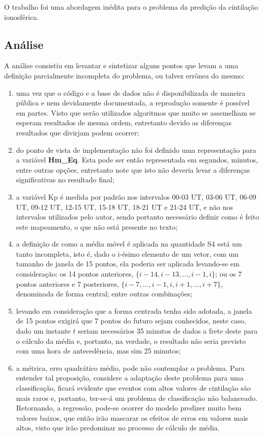 O trabalho foi uma abordagem inédita para o problema da predição da cintilação ionosférica.

\subsection{Análise}

A análise consistiu em levantar e sintetizar alguns pontos que levam a uma definição parcialmente incompleta do problema, ou talvez errônea do mesmo:

\begin{enumerate}
\item uma vez que o código e a base de dados não é disponibilizada de maneira pública e nem devidamente documentada, a reprodução somente é possível em partes. Visto que serão utilizados algoritmos que muito se assemelham se esperam resultados de mesma ordem, entretanto devido as diferenças resultados que divirjam podem ocorrer;
\item do ponto de vista de implementação não foi definido uma representação para a variável {\bf Hm\_Eq}. Esta pode ser então representada em segundos, minutos, entre outras opções, entretanto note que isto não deveria levar a diferenças significativas no resultado final;
\item a variável Kp é medida por padrão nos intervalos 00-03 UT, 03-06 UT, 06-09 UT, 09-12 UT, 12-15 UT, 15-18 UT, 18-21 UT e 21-24 UT, e não nos intervalos utilizados pelo autor, sendo portanto necessário definir como é feito este mapeamento, o que não está presente no texto;
\item a definição de como a média móvel é aplicada na quantidade S4 está um tanto incompleta, isto é, dado o i-ésimo elemento de um vetor, com um tamanho de janela de 15 pontos, ela poderia ser aplicada levando-se em consideração: os 14 pontos anteriores, $\{i-14, i-13, ..., i-1, i\}$; ou os 7 pontos anteriores e 7 posteriores, $\{i-7,...,i-1,i,i+1,...,i+7\}$, denominada de forma central; entre outras combinações;
\item levando em consideração que a forma centrada tenha sido adotada, a janela de 15 pontos exigirá que 7 pontos do futuro sejam conhecidos, neste caso, dado um instante $t$ seriam necessários 35 minutos de dados a frete deste para o cálculo da média e,  portanto, na verdade, o resultado não seria previsto com uma hora de antecedência, mas sim 25 minutos;
\item a métrica, erro quadrático médio, pode não contemplar o problema. Para entender tal proposição, considere a adaptação deste problema para uma classificação, ficará evidente que eventos com altos valores de cintilação são mais raros e, portanto, ter-se-á um problema de classificação não balanceado. Retornando, a regressão, pode-se ocorrer do modelo predizer muito bem valores baixos, que então irão mascarar os efeitos de erros em valores mais altos, visto que irão predominar no processo de cálculo de média.
\end{enumerate}

